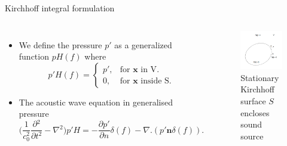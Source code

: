 \documentclass[10pt, aspectratio=169]{beamer}
\begin{document}
\begin{frame}{Kirchhoff integral formulation}
	\begin{columns}
		\begin{itemize}
			\item We define the pressure $p'$ as a generalized function $pH(f)$ where
			\begin{equation*}\label{Generalized_Functions}
				p' H(f) =\begin{cases}
					p' , & \text{for $\mathbf{x}$ in V}.     \\
					0,  & \text{for $\mathbf{x}$ inside S}.
				\end{cases}
			\end{equation*}
			\item The acoustic wave equation in generalised pressure
			\begin{equation*}\label{Generalized Wave Equation}
				\Bigg( \frac{1}{c_{0}^2}\frac{\partial{}^{2}}{\partial{t}^{2}}- \nabla{}^{2} \Bigg) p'H = -\frac{\partial p'}{\partial n}\delta(f) - \nabla.(p' \mathbf{n} \delta(f)).
			\end{equation*}
		\end{itemize}
				
		\begin{figure}[h]
			\includegraphics[scale = 0.3]{images/kirchhoff_surface.png}
			\caption*{Stationary Kirchhoff surface $S$ encloses sound source}	
		\end{figure}
							
	\end{columns}
\end{frame}
\end{document}
